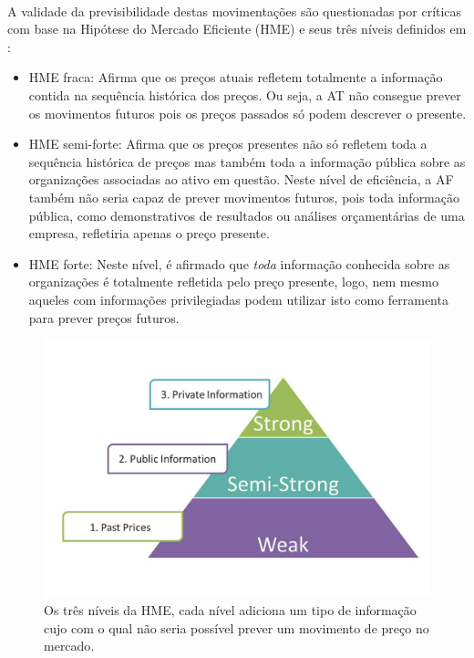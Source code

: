 \documentclass[grad,numbers]{coppe}
\begin{document}
  		\paragraph{}A validade da previsibilidade destas movimentações são questionadas por críticas com base na Hipótese do Mercado Eficiente (HME) e seus três níveis definidos em \cite{emh}:
			\begin{itemize}
				\item HME fraca: Afirma que os preços atuais refletem totalmente a informação contida na sequência histórica dos preços. Ou seja, a AT não consegue prever os movimentos futuros pois os preços passados só podem descrever o presente.
				\item HME semi-forte: Afirma que os preços presentes não só refletem toda a sequência histórica de preços mas também toda a informação pública sobre as organizações associadas ao ativo em questão. Neste nível de eficiência, a AF também não seria capaz de prever movimentos futuros, pois toda informação pública, como demonstrativos de resultados ou análises orçamentárias de uma empresa, refletiria apenas o preço presente.
				\item HME forte: Neste nível, é afirmado que \textit{toda} informação conhecida sobre as organizações é totalmente refletida pelo preço presente, logo, nem mesmo aqueles com informações privilegiadas podem utilizar isto como ferramenta para prever preços futuros.
			\end{itemize}
 			\begin{figure}[h]
 				\includegraphics[width=13cm]{emh.jpg}
 				\caption{Os três níveis da HME, cada nível adiciona um tipo de informação cujo com o qual não seria possível prever um movimento de preço no mercado\cite{emh-article}.}
 				\label{fig:emh}
 			\end{figure}
\end{document}
